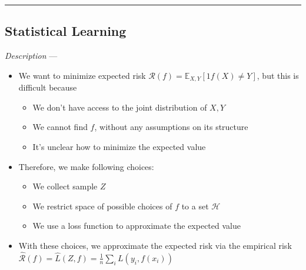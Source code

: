{\color{black}\hrule height 0.001mm}

\subsection*{Statistical Learning}
\emph{Description} --- 
\begin{itemize}
    \item We want to minimize expected risk $\mathcal{R}(f) = \mathbb{E}_{X,Y}[1{f(X) \neq Y}]$, but this is difficult because
    \begin{itemize}
        \item We don't have access to the joint distribution of $X,Y$
        \item We cannot find $f$, without any assumptions on its structure
        \item It's unclear how to minimize the expected value
    \end{itemize}
    \item Therefore, we make following choices:
    \begin{itemize}
        \item We collect sample $Z$
        \item We restrict space of possible choices of $f$ to a set $\mathcal{H}$
        \item We use a loss function to approximate the expected value
    \end{itemize}
    \item With these choices, we approximate the expected risk via the empirical risk $\hat{\mathcal{R}}(f) = \hat{L}(Z,f) = \frac{1}{n} \sum_i L(y_i, f(x_i))$
\end{itemize}